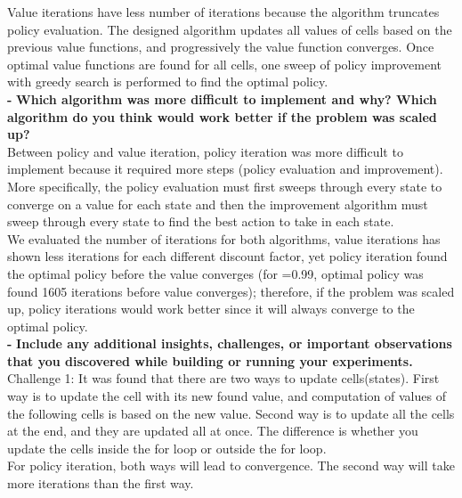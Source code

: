 \documentclass[11pt]{article}
\begin{document}
\noindent
Value iterations have less number of iterations because the algorithm truncates
policy evaluation. The designed algorithm updates all values of cells based on
the previous value functions, and progressively the value function converges.
Once optimal value functions are found for all cells, one sweep of policy
improvement with greedy search is performed to find the optimal policy. \\

\noindent
\textbf{-}
\noindent
\textbf{Which algorithm was more difficult to implement and why? Which algorithm
do you think would work better if the problem was scaled up?}
\\

\noindent
Between policy and value iteration, policy iteration was more difficult to
implement because it required more steps (policy evaluation and improvement).
More specifically, the policy evaluation must first sweeps through every state
to converge on a value for each state and then the improvement algorithm must
sweep through every state to find the best action to take in each state.\\

\noindent
We evaluated the number of iterations for both algorithms, value iterations has
shown less iterations for each different discount factor, yet policy iteration
found the optimal policy before the value converges (for =0.99, optimal policy
was found 1605 iterations before value converges); therefore, if the problem was
scaled up, policy iterations would work better since it will always converge to
the optimal policy. \\

\noindent
\textbf{-}
\noindent
\textbf{Include any additional insights, challenges, or important observations
that you discovered while building or running your experiments.}
\\

\noindent
Challenge 1: It was found that there are two ways to update cells(states). First
way is to update the cell with its new found value, and computation of values of
the following cells is based on the new value. Second way is to update all the
cells at the end, and they are updated all at once. The difference is whether
you update the cells inside the for loop or outside the for loop. \\

\noindent
For policy iteration, both ways will lead to convergence. The second way will
take more iterations than the first way. \\
\end{document}
